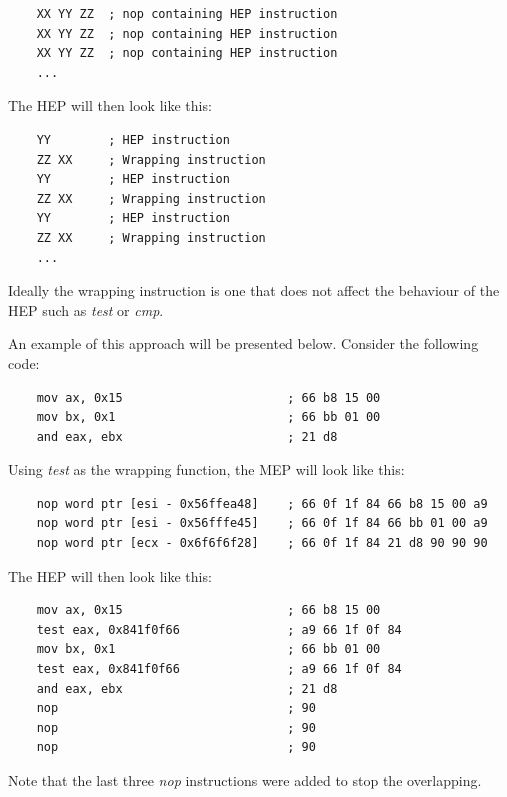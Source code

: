 \documentclass[11pt,twoside]{eitExjobb}
\begin{document}
\begin{verbatim}
    XX YY ZZ  ; nop containing HEP instruction
    XX YY ZZ  ; nop containing HEP instruction
    XX YY ZZ  ; nop containing HEP instruction
    ...
\end{verbatim} 

\noindent The HEP will then look like this:

\begin{verbatim}
    YY        ; HEP instruction
    ZZ XX     ; Wrapping instruction
    YY        ; HEP instruction
    ZZ XX     ; Wrapping instruction
    YY        ; HEP instruction
    ZZ XX     ; Wrapping instruction
    ...
\end{verbatim}

\noindent Ideally the wrapping instruction is one that does not affect the behaviour of the HEP such as \emph{test} or \emph{cmp}. 

An example of this approach will be presented below. Consider the following code:

\begin{verbatim}
    mov ax, 0x15                       ; 66 b8 15 00
    mov bx, 0x1                        ; 66 bb 01 00
    and eax, ebx                       ; 21 d8
\end{verbatim}

\noindent Using \emph{test} as the wrapping function, the MEP will look like this:

\begin{verbatim}
    nop word ptr [esi - 0x56ffea48]    ; 66 0f 1f 84 66 b8 15 00 a9
    nop word ptr [esi - 0x56fffe45]    ; 66 0f 1f 84 66 bb 01 00 a9
    nop word ptr [ecx - 0x6f6f6f28]    ; 66 0f 1f 84 21 d8 90 90 90
\end{verbatim}

\noindent The HEP will then look like this: 

\begin{verbatim}
    mov ax, 0x15                       ; 66 b8 15 00
    test eax, 0x841f0f66               ; a9 66 1f 0f 84
    mov bx, 0x1                        ; 66 bb 01 00
    test eax, 0x841f0f66               ; a9 66 1f 0f 84
    and eax, ebx                       ; 21 d8
    nop                                ; 90
    nop                                ; 90
    nop                                ; 90
\end{verbatim}

\noindent Note that the last three \emph{nop} instructions were added to stop the overlapping.
\end{document}
